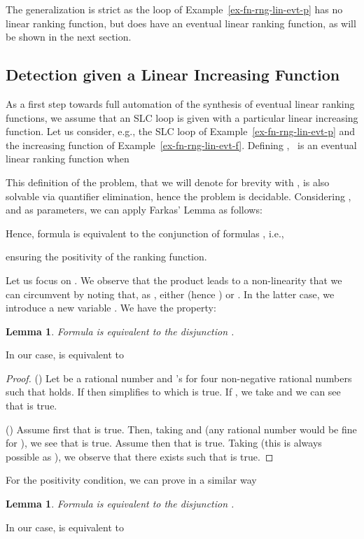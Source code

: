 \documentclass{acm_proc_article-sp}
\newtheorem{lemma}[theorem]{Lemma}
\begin{document}
The generalization is strict as the loop of
Example~\ref{ex-fn-rng-lin-evt-p} has no linear ranking function, but
does have an eventual linear ranking function, as will be shown in the
next section.


\subsection{Detection given a Linear Increasing Function}
\label{sec:elrf-semi-detection}

As a first step towards full automation of the synthesis of eventual
linear ranking functions, we assume that an SLC loop is given with a
particular linear increasing function.
Let us consider, e.g., the SLC loop of
Example~\ref{ex-fn-rng-lin-evt-p} and the increasing
function of Example~\ref{ex-fn-rng-lin-evt-f}.
Defining ,
~is an eventual linear ranking function when

This definition of the problem, that we will denote for brevity with
, is also solvable via quantifier
elimination, hence the problem is decidable.
Considering ,  and  as parameters,
we can apply Farkas' Lemma as follows:

Hence, formula  is equivalent to the conjunction
of formulas , i.e.,

ensuring the positivity of the ranking function.

Let us focus on .
We observe that the product 
leads to a non-linearity that we can circumvent
by noting that, as ,
either  (hence ) or .
In the latter case, we introduce a new variable .
We have the property:
\begin{lemma}
\label{lem1-fn-rng-lin-evt}
Formula  is equivalent to the disjunction
.
\end{lemma}
In our case,  is equivalent to


\begin{proof}
() Let   be a rational number and
's for   four non-negative rational numbers
such that  holds.
If  then   simplifies to 
which is true.
If , we take  and
we can see that  is true.

\noindent
() Assume first that  is true.
Then, taking  and  (any rational number
would be fine for ), we see that  is true.
Assume then that   is true.
Taking  (this is always possible as
), we observe that there exists 
such that   is true.
\end{proof}

For the positivity condition, we can prove in a similar way
\begin{lemma}
\label{lem2-fn-rng-lin-evt}
Formula  is equivalent to the disjunction
.
\end{lemma}
In our case,  is equivalent to
\end{document}
